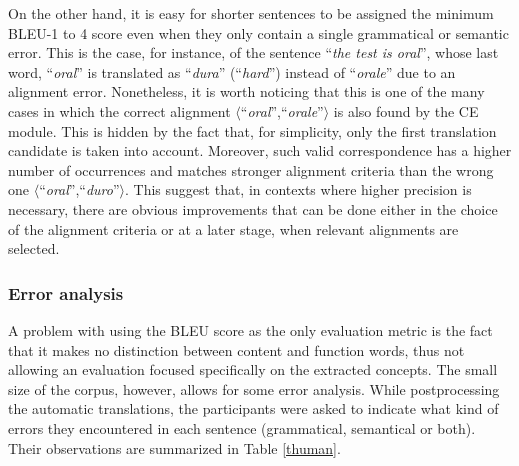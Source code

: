 On the other hand, it is easy for shorter sentences to be assigned the minimum BLEU-1 to 4 score even when they only contain a single grammatical or semantic error. 
This is the case, for instance, of the sentence ``\textit{the test is oral}'', whose last word, ``\textit{oral}'' is translated as ``\textit{dura}'' (``\textit{hard}'') instead of ``\textit{orale}'' due to an alignment error. 
Nonetheless, it is worth noticing that this is one of the many cases in which the correct alignment $\langle$``\textit{oral}'',``\textit{orale}''$\rangle$ is also found by the CE module. 
This is hidden by the fact that, for simplicity, only the first translation candidate is taken into account.
Moreover, such valid correspondence has a higher number of occurrences and matches stronger alignment criteria than the wrong one $\langle$``\textit{oral}'',``\textit{duro}''$\rangle$. 
This suggest that, in contexts where higher precision is necessary, there are obvious improvements that can be done either in the choice of the alignment criteria or at a later stage, when relevant alignments are selected. \smallskip

\subsubsection{Error analysis}
A problem with using the BLEU score as the only evaluation metric is the fact that it makes no distinction between content and function words, thus not allowing an evaluation focused specifically on the extracted concepts. 
The small size of the corpus, however, allows for some error analysis. 
While postprocessing the automatic translations, the participants were asked to indicate what kind of errors they encountered in each sentence (grammatical, semantical or both). Their observations are summarized in Table \ref{thuman}. \smallskip

